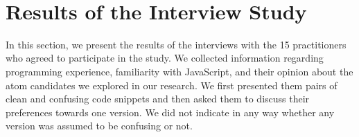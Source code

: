 \

\vspace*{-0.5cm}
\section{Results of the Interview Study}
\label{sec:interview-results}


In this section, we present the results of the 
interviews with the 15 practitioners who agreed to participate in the study. 
We collected information regarding programming
experience, familiarity with JavaScript, and their opinion about the \na atom candidates we explored in our research. We first presented them pairs of clean and confusing code snippets and then asked them to discuss their preferences towards one version. We did not indicate in any way whether any version was assumed to be confusing or not. 



